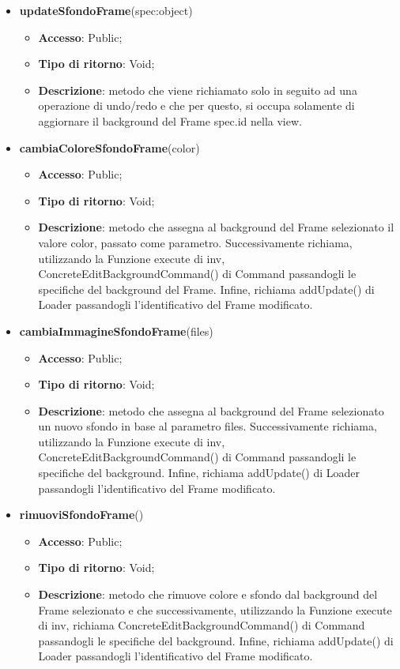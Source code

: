 {{\begin{itemize}
\begin{itemize}
			\end{itemize}
			\item \textbf{updateSfondoFrame}(spec:object)
			\begin{itemize}
				\item \textbf{Accesso}: Public;
				\item \textbf{Tipo di ritorno}: Void;
				\item \textbf{Descrizione}: metodo che viene richiamato solo in seguito ad una operazione di undo/redo e che per questo, si occupa solamente di aggiornare il background del Frame spec.id nella view.
			\end{itemize}
			\item \textbf{cambiaColoreSfondoFrame}(color)
			\begin{itemize}
				\item \textbf{Accesso}: Public;
				\item \textbf{Tipo di ritorno}: Void;
				\item \textbf{Descrizione}: metodo che assegna al background del Frame selezionato il valore color, passato come parametro. Successivamente richiama, utilizzando la Funzione execute di inv, ConcreteEditBackgroundCommand() di Command passandogli le specifiche del background del Frame. Infine, richiama addUpdate() di Loader passandogli l'identificativo del Frame modificato.
			\end{itemize}
			\item \textbf{cambiaImmagineSfondoFrame}(files)
			\begin{itemize}
				\item \textbf{Accesso}: Public;
				\item \textbf{Tipo di ritorno}: Void;
				\item \textbf{Descrizione}: metodo che assegna al background del Frame selezionato un nuovo sfondo in base al parametro files. Successivamente richiama, utilizzando la Funzione execute di inv, ConcreteEditBackgroundCommand() di Command passandogli le specifiche del background. Infine, richiama addUpdate() di Loader passandogli l'identificativo del Frame modificato.
			\end{itemize}
			\item \textbf{rimuoviSfondoFrame}()
			\begin{itemize}
				\item \textbf{Accesso}: Public;
				\item \textbf{Tipo di ritorno}: Void;
				\item \textbf{Descrizione}: metodo che rimuove colore e sfondo dal background del Frame selezionato e che successivamente, utilizzando la Funzione execute di inv, richiama ConcreteEditBackgroundCommand() di Command passandogli le specifiche del background. Infine, richiama addUpdate() di Loader passandogli l'identificativo del Frame modificato.

\end{itemize}
\end{itemize}}}
